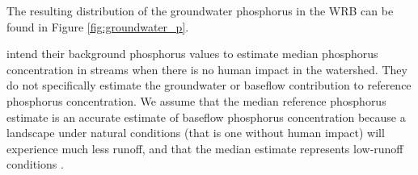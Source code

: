 	The resulting distribution of the groundwater phosphorus in the WRB can be found in Figure \ref{fig:groundwater_p}.
	
	\citet{robertson_wadeable_2006} intend their background phosphorus values to estimate median phosphorus concentration in streams when there is no human impact in the watershed. They do not specifically estimate the groundwater or baseflow contribution to reference phosphorus concentration. We assume that the median reference phosphorus estimate is an accurate estimate of baseflow phosphorus concentration because a landscape under natural conditions (that is one without human impact) will experience much less runoff, and that the median estimate represents low-runoff conditions .

